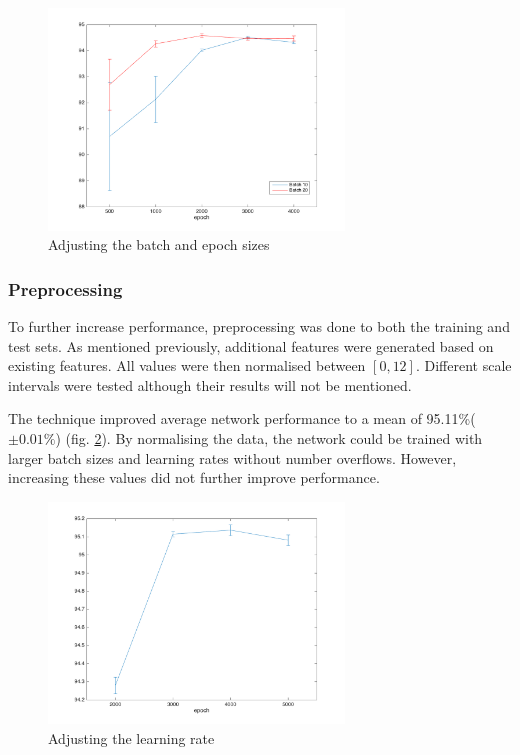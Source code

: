\documentclass[11]{article}
\begin{document}
\begin{figure}[h]
\centering
\includegraphics[width=0.7\textwidth]{batchandepoch.png}
\caption{Adjusting the batch and epoch sizes}
\label{fig:batchandepoch}
\end{figure}

\subsubsection{Preprocessing}
To further increase performance, preprocessing was done to both the training and test sets. As mentioned previously, additional features were generated based on existing features. All values were then normalised between $[0,12]$. Different scale intervals were tested although their results will not be mentioned. 

The technique improved average network performance to a mean of 95.11\%($\pm 0.01\%$) (fig. \ref{fig:normalised}). By normalising the data, the network could be trained with larger batch sizes and learning rates without number overflows. However, increasing these values did not further improve performance. 

\begin{figure}[h]
\centering
\includegraphics[width=0.7\textwidth]{normalised.png}
\caption{Adjusting the learning rate}
\label{fig:normalised}
\end{figure}
\end{document}
